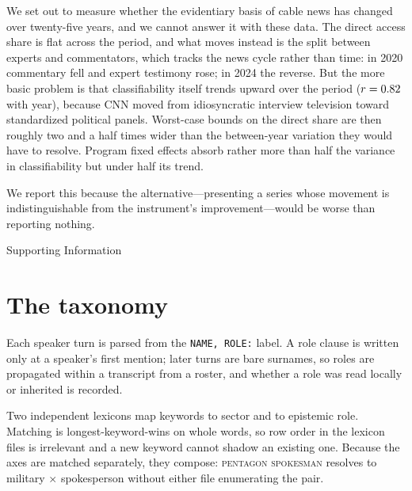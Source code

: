 \documentclass[12pt, letterpaper]{article}
\begin{document}
We set out to measure whether the evidentiary basis of cable news has changed
over twenty-five years, and we cannot answer it with these data. The direct
access share is flat across the period, and what moves instead is the split
between experts and commentators, which tracks the news cycle rather than time:
in 2020 commentary fell and expert testimony rose; in 2024 the reverse. But the
more basic problem is that classifiability itself trends upward over the period
($r = 0.82$ with year), because CNN moved from idiosyncratic interview
television toward standardized political panels. Worst-case bounds on the direct
share are then roughly two and a half times wider than the between-year
variation they would have to resolve. Program fixed effects absorb rather more
than half the variance in classifiability but under half its trend.

We report this because the alternative---presenting a series whose movement is
indistinguishable from the instrument's improvement---would be worse than
reporting nothing.

\clearpage



\clearpage
\appendix
\renewcommand{\thesection}{SI \arabic{section}}
\setcounter{table}{0}\renewcommand\thetable{\thesection.\arabic{table}}

\begin{center}
\Large{Supporting Information}
\end{center}

\section{The taxonomy}\label{si_taxonomy}

Each speaker turn is parsed from the \texttt{NAME, ROLE:} label. A role clause
is written only at a speaker's first mention; later turns are bare surnames, so
roles are propagated within a transcript from a roster, and whether a role was
read locally or inherited is recorded.

Two independent lexicons map keywords to sector and to epistemic role. Matching
is longest-keyword-wins on whole words, so row order in the lexicon files is
irrelevant and a new keyword cannot shadow an existing one. Because the axes are
matched separately, they compose: \textsc{pentagon spokesman} resolves to
military $\times$ spokesperson without either file enumerating the pair.
\end{document}
